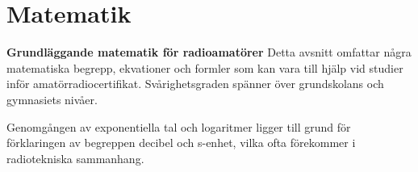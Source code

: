 \chapter{Matematik}

\textbf{Grundläggande matematik för radioamatörer}
Detta avsnitt omfattar några matematiska begrepp, ekvationer och formler som kan
vara till hjälp vid studier inför amatörradiocertifikat. Svårighetsgraden
spänner över grundskolans och gymnasiets nivåer.

Genomgången av exponentiella tal och logaritmer ligger till grund för
förklaringen av begreppen decibel och s-enhet, vilka ofta förekommer i
radiotekniska sammanhang.



